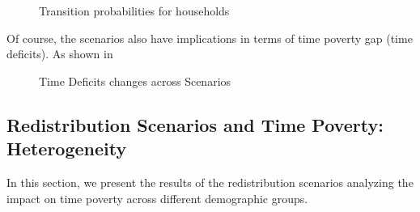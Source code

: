 \documentclass[
  11pt,
]{article}
\begin{document}
\begin{figure}[H]


\caption{\label{fig-transition2}Transition probabilities for households}

\end{figure}%

Of course, the scenarios also have implications in terms of time poverty
gap (time deficits). As shown in

\begin{figure}[H]


\caption{\label{fig-transition}Time Deficits changes across Scenarios}

\end{figure}%

\subsection{Redistribution Scenarios and Time Poverty:
Heterogeneity}\label{redistribution-scenarios-and-time-poverty-heterogeneity}

In this section, we present the results of the redistribution scenarios
analyzing the impact on time poverty across different demographic
groups.
\end{document}

